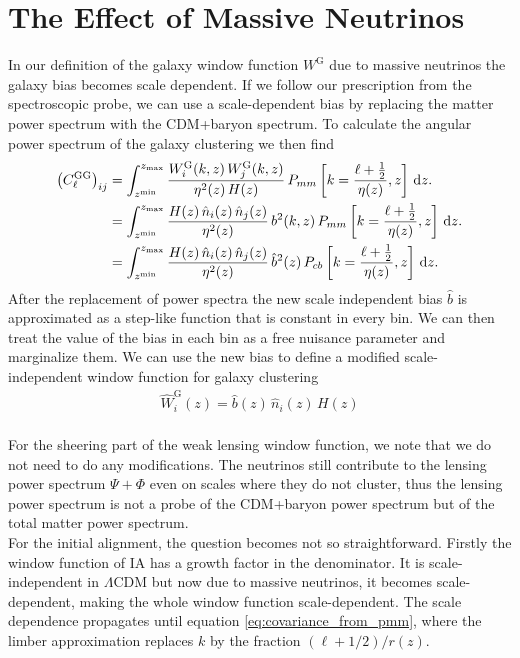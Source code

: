 \documentclass[../main.tex]{subfiles}
\begin{document}
\section{The Effect of Massive Neutrinos}\label{sec:Photo_Neutrinos}
In our definition of the galaxy window function $W^\mathrm{G}$ due to massive neutrinos the galaxy bias becomes scale dependent. If we follow our prescription from the spectroscopic probe, we can use a scale-dependent bias by replacing the matter power spectrum with the CDM+baryon spectrum. To calculate the angular power spectrum of the galaxy clustering we then find 
\begin{align}
    \left(C^\mathrm{GG}_{\ell}\right)_{ij} &= \int_{z^\mathrm{min}}^{z_\mathrm{max}} \frac{W_i^\mathrm{G}(k,z) \,  W_j^\mathrm{G}(k,z)}{\eta^2(z)\,H(z)}\,P_{mm}\left[k=\frac{\ell+\frac{1}{2}}{\eta(z)},z\right]\, \mathrm{d} z. \nonumber \\
    &=\int_{z^\mathrm{min}}^{z_\mathrm{max}} \frac{H(z)\,\hat{n}_i(z)\,\hat{n}_j(z)}{\eta^2(z)}\,b^2(k,z)\,P_{mm}\left[k=\frac{\ell+\frac{1}{2}}{\eta(z)},z\right]\, \mathrm{d} z. \nonumber \\
    &=\int_{z^\mathrm{min}}^{z_\mathrm{max}} \frac{H(z)\,\hat{n}_i(z)\,\hat{n}_j(z)}{\eta^2(z)}\,\hat{b}^2(z)\,P_{cb}\left[k=\frac{\ell+\frac{1}{2}}{\eta(z)},z\right]\, \mathrm{d} z. 
\end{align}
After the replacement of power spectra the new scale independent bias $\hat{b}$ is approximated as a step-like function that is constant in every bin. We can then treat the value of the bias in each bin as a free nuisance parameter and marginalize them. We can use the new bias to define a modified scale-independent window function for galaxy clustering\begin{align*}
    \hat{W}^\mathrm{G}_i(z) = \hat{b}(z)\,\hat{n}_i(z)\,H(z)
\end{align*}\\
For the sheering part of the weak lensing window function, we note that we do not need to do any modifications. The neutrinos still contribute to the lensing power spectrum $\Psi+\Phi$ even on scales where they do not cluster, thus the lensing power spectrum is not a probe of the CDM+baryon power spectrum but of the total matter power spectrum.\\
For the initial alignment, the question becomes not so straightforward. Firstly the window function of IA has a growth factor in the denominator. It is scale-independent in $\Lambda$CDM but now due to massive neutrinos, it becomes scale-dependent, making the whole window function scale-dependent. The scale dependence propagates until equation \ref{eq:covariance_from_pmm}, where the limber approximation replaces $k$ by the fraction $(\ell+1/2)/r(z)$.\\
\end{document}
